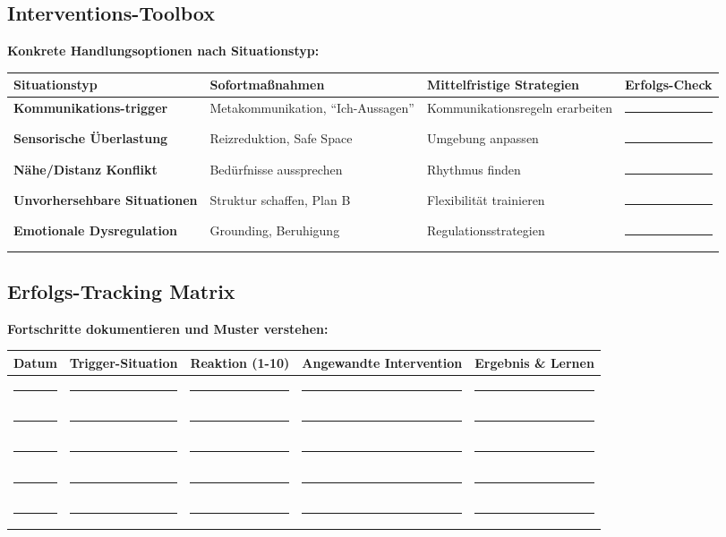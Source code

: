 {\hypertarget{interventions-toolbox}{%
\subsection{Interventions-Toolbox}}\label{interventions-toolbox}

\textbf{Konkrete Handlungsoptionen nach Situationstyp:}

\begin{center}
\begin{tabular}{|p{3cm}|p{4cm}|p{4cm}|p{3cm}|}
\hline
\textbf{Situationstyp} & \textbf{Sofortmaßnahmen} & \textbf{Mittelfristige Strategien} & \textbf{Erfolgs-Check} \\
\hline
\textbf{Kommunikations-trigger} & Metakommunikation, ``Ich-Aussagen'' & Kommunikationsregeln erarbeiten & \rule{2.5cm}{0.4pt} \\
\hline
\textbf{Sensorische Überlastung} & Reizreduktion, Safe Space & Umgebung anpassen & \rule{2.5cm}{0.4pt} \\
\hline
\textbf{Nähe/Distanz Konflikt} & Bedürfnisse aussprechen & Rhythmus finden & \rule{2.5cm}{0.4pt} \\
\hline
\textbf{Unvorhersehbare Situationen} & Struktur schaffen, Plan B & Flexibilität trainieren & \rule{2.5cm}{0.4pt} \\
\hline
\textbf{Emotionale Dysregulation} & Grounding, Beruhigung & Regulationsstrategien & \rule{2.5cm}{0.4pt} \\
\hline
\end{tabular}
\end{center}

\hypertarget{erfolgs-tracking-matrix}{%
\subsection{Erfolgs-Tracking Matrix}}\label{erfolgs-tracking-matrix}

\textbf{Fortschritte dokumentieren und Muster verstehen:}

\begin{center}
\begin{tabular}{|p{2cm}|p{3cm}|p{2cm}|p{3cm}|p{3cm}|}
\hline
\textbf{Datum} & \textbf{Trigger-Situation} & \textbf{Reaktion (1-10)} & \textbf{Angewandte Intervention} & \textbf{Ergebnis \& Lernen} \\
\hline
\rule{1.5cm}{0.4pt} & \rule{2.5cm}{0.4pt} & \rule{1.5cm}{0.4pt} & \rule{2.5cm}{0.4pt} & \rule{2.5cm}{0.4pt} \\
\hline
\rule{1.5cm}{0.4pt} & \rule{2.5cm}{0.4pt} & \rule{1.5cm}{0.4pt} & \rule{2.5cm}{0.4pt} & \rule{2.5cm}{0.4pt} \\
\hline
\rule{1.5cm}{0.4pt} & \rule{2.5cm}{0.4pt} & \rule{1.5cm}{0.4pt} & \rule{2.5cm}{0.4pt} & \rule{2.5cm}{0.4pt} \\
\hline
\rule{1.5cm}{0.4pt} & \rule{2.5cm}{0.4pt} & \rule{1.5cm}{0.4pt} & \rule{2.5cm}{0.4pt} & \rule{2.5cm}{0.4pt} \\
\hline
\rule{1.5cm}{0.4pt} & \rule{2.5cm}{0.4pt} & \rule{1.5cm}{0.4pt} & \rule{2.5cm}{0.4pt} & \rule{2.5cm}{0.4pt} \\
\hline
\end{tabular}
\end{center}

}
